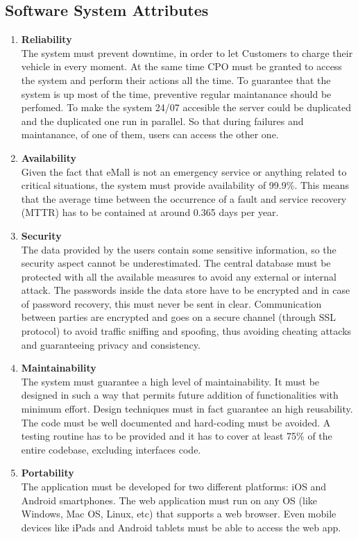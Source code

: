 \subsection{Software System Attributes}

\begin{enumerate}[label=\textbf{NFR\arabic*}:]
    \item \textbf{Reliability}\\
    The system must prevent downtime, in order to let Customers to charge their vehicle in every moment. At the same time CPO must be granted to access the system and perform their actions all the time.
    To guarantee that the system is up most of the time, preventive regular maintanance should be perfomed. To make the system 24/07 accesible the server could be duplicated and the duplicated one run in parallel. So that during failures and maintanance, of one of them, users can access the other one. 
    \item \textbf{Availability}\\
    Given the fact that eMall is not an emergency service or anything related to critical situations, the system must provide availability of 99.9\%. This means that the average time between the occurrence of a fault and service recovery (MTTR) has to be contained at around 0.365 days per year.
    \item \textbf{Security}\\
    The data provided by the users contain some sensitive information, so the security aspect cannot be underestimated. The central database must be protected with all the available measures to avoid any external or internal attack. The passwords inside the data store have to be encrypted and in case of password recovery, this must never be sent in clear.
    Communication between parties are encrypted and goes on a secure channel (through SSL protocol) to avoid traffic sniffing and spoofing, thus avoiding cheating attacks and guaranteeing privacy and consistency.
    \item \textbf{Maintainability}\\
    The system must guarantee a high level of maintainability. It must be designed in such a way that permits future addition of functionalities with minimum effort.
    Design techniques must in fact guarantee an high reusability. The code must be well documented and hard-coding must be avoided. A testing routine has to be provided and it has to cover at least 75\% of the entire codebase, excluding interfaces code.
    \item \textbf{Portability}\\
    The application must be developed for two different platforms: iOS and Android smartphones. The web application must run on any OS (like Windows, Mac OS, Linux, etc) that supports a web browser. Even mobile devices like iPads and Android tablets must be able to access the web app.
\end{enumerate}

